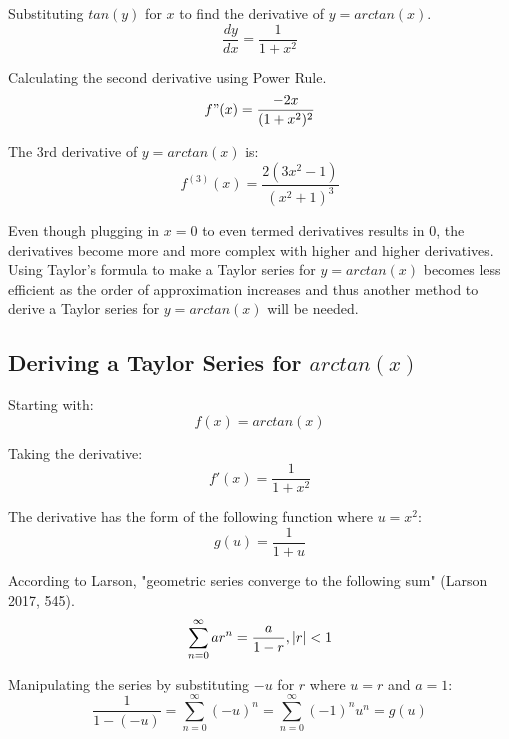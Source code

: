 \documentclass[12pt, titlepage]{article}
\begin{document}
Substituting \(tan(y)\) for \(x\) to find the derivative of \(y = arctan(x)\).
\begin{equation*}
 \frac{dy}{dx}  = \frac{1}{1 + x^{2}}
\end{equation*}

Calculating the second derivative using Power Rule.
\begin{equation*}
    f"(x) = \frac{-2x}{(1+x^{2})^{2}}
\end{equation*}

The 3rd derivative of \(y = arctan(x)\) is:
\begin{equation*}
    f^{(3)}(x) = \frac{2(3x^{2}-1)}{(x^{2}+1)^{3}}
\end{equation*}

Even though plugging in \(x = 0\) to even termed derivatives results in 0, the derivatives become more and more complex with higher and higher derivatives. Using Taylor's formula to make a Taylor series for \(y = arctan(x)\) becomes less efficient as the order of approximation increases and thus another method to derive a Taylor series for \(y = arctan(x)\) will be needed.

\subsection{Deriving a Taylor Series for \(arctan(x)\)}
Starting with:
\begin{equation*}
  f(x) = arctan(x)
\end{equation*}

Taking the derivative:
\begin{equation*}
f'(x) = \frac{1}{1 + x^{2}}
\end{equation*}

The derivative has the form of the following function where \(u = x^2\):
\begin{equation*}
    g(u) = \frac{1}{1+u}
\end{equation*}

According to Larson, "geometric series converge to the following sum" (Larson 2017, 545).
\begin{equation*}
	\sum_{n=0}^{\infty} ar^{n} = \frac{a}{1-r} , \abs{r} < 1
\end{equation*}

Manipulating the series by substituting \(-u\) for \(r\) where \(u = r\) and \(a = 1\):
\begin{equation*}
	 \frac{1}{1 - (-u)} = \sum_{n=0}^{\infty} (-u)^{n} = \sum_{n=0}^{\infty} (-1)^{n}u^{n} = g(u)  
\end{equation*}
\end{document}
